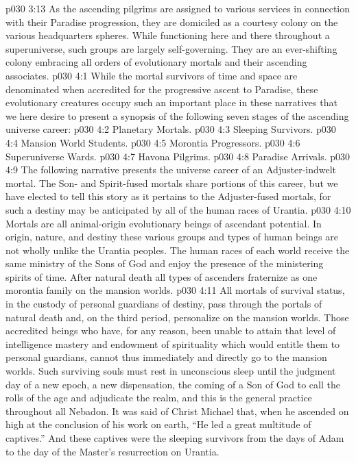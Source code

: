 \pc \vs p030 3:13 \bibnobreakspace {} As the ascending pilgrims are assigned to various services in connection with their Paradise progression, they are domiciled as a courtesy colony on the various headquarters spheres. While functioning here and there throughout a superuniverse, such groups are largely self\hyp{}governing. They are an ever\hyp{}shifting colony embracing all orders of evolutionary mortals and their ascending associates.
\vs p030 4:1 While the mortal survivors of time and space are denominated  when accredited for the progressive ascent to Paradise, these evolutionary creatures occupy such an important place in these narratives that we here desire to present a synopsis of the following seven stages of the ascending universe career:\plusone
\pc \vs p030 4:2 \bibnobreakspace Planetary Mortals.
\vs p030 4:3 \bibnobreakspace Sleeping Survivors.
\vs p030 4:4 \bibnobreakspace Mansion World Students.
\vs p030 4:5 \bibnobreakspace Morontia Progressors.
\vs p030 4:6 \bibnobreakspace Superuniverse Wards.
\vs p030 4:7 \bibnobreakspace Havona Pilgrims.
\vs p030 4:8 \bibnobreakspace Paradise Arrivals.
\pc \vs p030 4:9 The following narrative presents the universe career of an Adjuster\hyp{}indwelt mortal. The Son\hyp{} and Spirit\hyp{}fused mortals share portions of this career, but we have elected to tell this story as it pertains to the Adjuster\hyp{}fused mortals, for such a destiny may be anticipated by all of the human races of Urantia.
\pc \vs p030 4:10 \bibnobreakspace {} Mortals are all animal\hyp{}origin evolutionary beings of ascendant potential. In origin, nature, and destiny these various groups and types of human beings are not wholly unlike the Urantia peoples. The human races of each world receive the same ministry of the Sons of God and enjoy the presence of the ministering spirits of time. After natural death all types of ascenders fraternize as one morontia family on the mansion worlds.
\pc \vs p030 4:11 \bibnobreakspace {} All mortals of survival status, in the custody of personal guardians of destiny, pass through the portals of natural death and, on the third period, personalize on the mansion worlds. Those accredited beings who have, for any reason, been unable to attain that level of intelligence mastery and endowment of spirituality which would entitle them to personal guardians, cannot thus immediately and directly go to the mansion worlds. Such surviving souls must rest in unconscious sleep until the judgment day of a new epoch, a new dispensation, the coming of a Son of God to call the rolls of the age and adjudicate the realm, and this is the general practice throughout all Nebadon. It was said of Christ Michael that, when he ascended on high at the conclusion of his work on earth, “He led a great multitude of captives.” And these captives were the sleeping survivors from the days of Adam to the day of the Master’s resurrection on Urantia.

